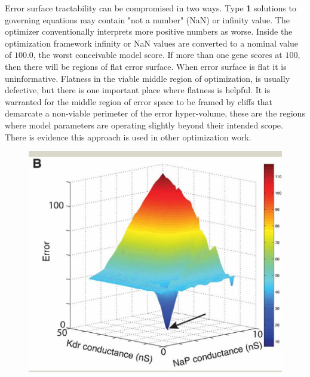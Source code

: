 Error surface tractability can be compromised in two ways.
Type \textbf{1} solutions to governing equations may contain "not a number" (NaN) or infinity value. The optimizer conventionally interprets more positive numbers as worse. Inside the optimization framework infinity or NaN values are converted to a nominal value of $100.0$, the worst conceivable model score. If more than one gene scores at $100$, then there will be regions of flat error surface. %
When error surface is flat it is uninformative. Flatness in the viable middle region of optimization, is usually defective, but there is one important place where flatness is helpful. It is warranted for the middle region of error space to be framed by cliffs that demarcate a non-viable perimeter of the error hyper-volume, these are the regions where model parameters are operating slightly beyond their intended scope. There is evidence this approach is used in other optimization work.


\begin{figure}
    \centering
    \includegraphics[scale=0.65]{figures/fninf-01-001-g009.jpg}
    \caption{\cite{}}
    \label{fig:best_at_edge}
\end{figure}

